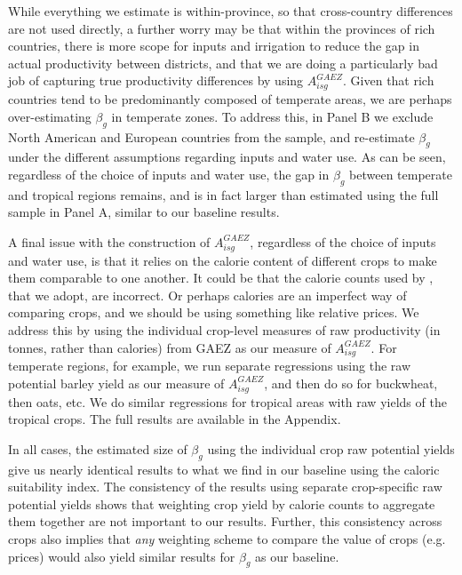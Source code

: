 \documentclass[11pt]{article}
\begin{document}
While everything we estimate is within-province, so that cross-country differences are not used directly, a further worry may be that within the provinces of rich countries, there is more scope for inputs and irrigation to reduce the gap in actual productivity between districts, and that we are doing a particularly bad job of capturing true productivity differences by using $A_{isg}^{GAEZ}$. Given that rich countries tend to be predominantly composed of temperate areas, we are perhaps over-estimating $\beta_g$ in temperate zones. To address this, in Panel B we exclude North American and European countries from the sample, and re-estimate $\beta_g$ under the different assumptions regarding inputs and water use. As can be seen, regardless of the choice of inputs and water use, the gap in $\beta_g$ between temperate and tropical regions remains, and is in fact larger than estimated using the full sample in Panel A, similar to our baseline results.

A final issue with the construction of $A^{GAEZ}_{isg}$, regardless of the choice of inputs and water use, is that it relies on the calorie content of different crops to make them comparable to one another. It could be that the calorie counts used by \cite{galorozak2016}, that we adopt, are incorrect. Or perhaps calories are an imperfect way of comparing crops, and we should be using something like relative prices. We address this by using the individual crop-level measures of raw productivity (in tonnes, rather than calories) from GAEZ as our measure of $A^{GAEZ}_{isg}$. For temperate regions, for example, we run separate regressions using the raw potential barley yield as our measure of $A^{GAEZ}_{isg}$, and then do so for buckwheat, then oats, etc. We do similar regressions for tropical areas with raw yields of the tropical crops. The full results are available in the Appendix. 

In all cases, the estimated size of $\beta_g$ using the individual crop raw potential yields give us nearly identical results to what we find in our baseline using the caloric suitability index. The consistency of the results using separate crop-specific raw potential yields shows that weighting crop yield by calorie counts to aggregate them together are not important to our results. Further, this consistency across crops also implies that \textit{any} weighting scheme to compare the value of crops (e.g. prices) would also yield similar results for $\beta_g$ as our baseline. 
\end{document}
